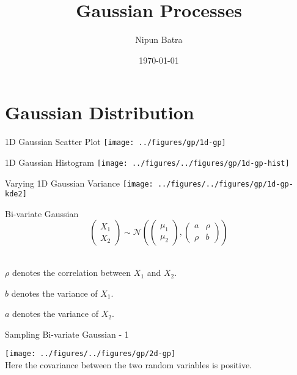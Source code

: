 \documentclass{beamer}
\title{Gaussian Processes}
\date{\today}
\author{Nipun Batra}
\institute{IIT Gandhinagar}
\begin{document}
	\maketitle
	
	
	
	\section{Gaussian Distribution}
	\begin{frame}{1D Gaussian Scatter Plot}
		\texttt{[image: ../figures/gp/1d-gp]}
	\end{frame}
	
	\begin{frame}{1D Gaussian Histogram}
		\texttt{[image: ../figures/../figures/gp/1d-gp-hist]}
	\end{frame}
	
	\begin{frame}{Varying 1D Gaussian Variance}
		\texttt{[image: ../figures/../figures/gp/1d-gp-kde2]}
	\end{frame}
	
	\begin{frame}{Bi-variate Gaussian}
		$$
		\begin{pmatrix}
		X_1 \\
		X_2
		\end{pmatrix}  \sim \mathcal{N} \left( \begin{pmatrix}
		\mu_1 \\
		\mu_2
		\end{pmatrix} , \begin{pmatrix}
		a &\rho \\
		\rho & b
		\end{pmatrix} \right)
		$$\\
		
		\begin{center}
			$\rho$ denotes the correlation between $X_1$ and $X_2$.
			
			$b$ denotes the variance of $X_1$.
			
			$a$ denotes the variance of $X_2$.
		\end{center}
		
	\end{frame}
	
	\begin{frame}{Sampling Bi-variate Gaussian - 1}
		\begin{center}
			\texttt{[image: ../figures/../figures/gp/2d-gp]}\\
			Here the covariance between the two random variables is positive.
		\end{center}
	\end{frame}
	
\end{document}
